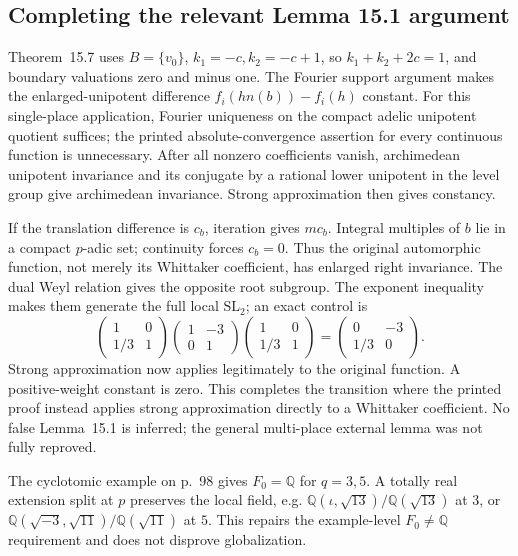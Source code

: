 \documentclass[10pt]{article}
\begin{document}
\subsection*{Completing the relevant Lemma 15.1 argument}
Theorem 15.7 uses \(B=\{v_0\}\), \(k_1=-c,k_2=-c+1\), so \(k_1+k_2+2c=1\), and boundary valuations zero and minus one. The Fourier support argument makes the enlarged-unipotent difference \(f_i(hn(b))-f_i(h)\) constant. For this single-place application, Fourier uniqueness on the compact adelic unipotent quotient suffices; the printed absolute-convergence assertion for every continuous function is unnecessary. After all nonzero coefficients vanish, archimedean unipotent invariance and its conjugate by a rational lower unipotent in the level group give archimedean invariance. Strong approximation then gives constancy.\par
If the translation difference is \(c_b\), iteration gives \(mc_b\). Integral multiples of \(b\) lie in a compact \(p\)-adic set; continuity forces \(c_b=0\). Thus the original automorphic function, not merely its Whittaker coefficient, has enlarged right invariance. The dual Weyl relation gives the opposite root subgroup. The exponent inequality makes them generate the full local \(\mathrm{SL}_2\); an exact control is \[\begin{pmatrix}1&0\\1/3&1\end{pmatrix}
 \begin{pmatrix}1&-3\\0&1\end{pmatrix}
 \begin{pmatrix}1&0\\1/3&1\end{pmatrix}
 =\begin{pmatrix}0&-3\\1/3&0\end{pmatrix}.\] Strong approximation now applies legitimately to the original function. A positive-weight constant is zero. This completes the transition where the printed proof instead applies strong approximation directly to a Whittaker coefficient. No false Lemma 15.1 is inferred; the general multi-place external lemma was not fully reproved.\par
The cyclotomic example on p. 98 gives \(F_0=\mathbb Q\) for \(q=3,5\). A totally real extension split at \(p\) preserves the local field, e.g. \(\mathbb Q(\iota,\sqrt{13})/\mathbb Q(\sqrt{13})\) at \(3\), or \(\mathbb Q(\sqrt{-3},\sqrt{11})/\mathbb Q(\sqrt{11})\) at \(5\). This repairs the example-level \(F_0\ne\mathbb Q\) requirement and does not disprove globalization.\par
\end{document}
